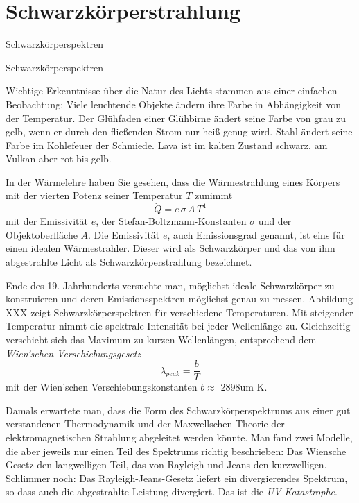 \section{Schwarzkörperstrahlung}

\begin{marginfigure}
    \caption{Schwarzkörperspektren}
\end{marginfigure}



\begin{marginfigure}
    \caption{Schwarzkörperspektren}
\end{marginfigure}

Wichtige Erkenntnisse über die Natur des Lichts stammen aus einer einfachen Beobachtung: Viele leuchtende Objekte ändern ihre Farbe in Abhängigkeit von der Temperatur. Der Glühfaden einer Glühbirne ändert seine Farbe von grau zu gelb, wenn er durch den fließenden Strom nur heiß genug wird. Stahl ändert seine Farbe im Kohlefeuer der Schmiede. Lava ist im kalten Zustand schwarz, am Vulkan aber rot bis gelb.

In der Wärmelehre haben Sie gesehen, dass die Wärmestrahlung eines Körpers mit der vierten Potenz seiner Temperatur $T$ zunimmt
\begin{equation}
    \dot{Q} = e \, \sigma \, A \, T^4
\end{equation}
mit der Emissivität $e$, der Stefan-Boltzmann-Konstanten $\sigma$ und der Objektoberfläche $A$. Die Emissivität $e$, auch Emissionsgrad genannt, ist eins für einen idealen Wärmestrahler. Dieser wird als Schwarzkörper und das von ihm abgestrahlte Licht als Schwarzkörperstrahlung bezeichnet.

Ende des 19. Jahrhunderts versuchte man, möglichst ideale Schwarzkörper zu konstruieren und deren Emissionsspektren möglichst genau zu messen. Abbildung XXX zeigt Schwarzkörperspektren für verschiedene Temperaturen. Mit steigender Temperatur nimmt die spektrale Intensität bei jeder Wellenlänge zu. Gleichzeitig verschiebt sich das Maximum zu kurzen Wellenlängen, entsprechend dem \emph{Wien'schen Verschiebungsgesetz}
\begin{equation}
    \lambda_{peak} = \frac{b}{T}
\end{equation}
mit der Wien'schen Verschiebungskonstanten $b \approx $ \si{2898}{um K}.

Damals erwartete man, dass die Form des Schwarzkörperspektrums aus einer gut verstandenen Thermodynamik und der Maxwellschen Theorie der elektromagnetischen Strahlung abgeleitet werden könnte. Man fand zwei Modelle, die aber jeweils nur einen Teil des Spektrums richtig beschrieben: Das Wiensche Gesetz den langwelligen Teil, das von Rayleigh und Jeans den kurzwelligen. Schlimmer noch: Das Rayleigh-Jeans-Gesetz liefert ein divergierendes Spektrum, so dass auch die abgestrahlte Leistung divergiert. Das ist die \emph{UV-Katastrophe}.

